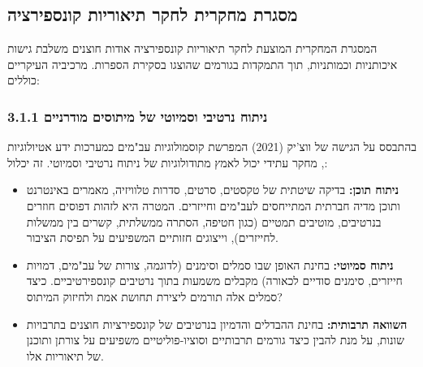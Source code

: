 \documentclass[12pt,a4paper]{article}
\begin{document}
\subsection{מסגרת מחקרית לחקר תיאוריות קונספירציה}

המסגרת המחקרית המוצעת לחקר תיאוריות קונספירציה אודות חוצנים משלבת גישות איכותניות וכמותניות, תוך התמקדות בגורמים שהוצגו בסקירת הספרות. מרכיביה העיקריים כוללים:

\subsubsection*{3.1.1 ניתוח נרטיבי וסמיוטי של מיתוסים מודרניים}
בהתבסס על הגישה של ווצ'יק (2021) המפרשת קוסמולוגיות עב"מים כמערכות ידע אטיולוגיות \cite{wojcik2021cosmologies}, מחקר עתידי יכול לאמץ מתודולוגיות של ניתוח נרטיבי וסמיוטי. זה יכלול:
\begin{itemize}
    \item \textbf{ניתוח תוכן:} בדיקה שיטתית של טקסטים, סרטים, סדרות טלוויזיה, מאמרים באינטרנט ותוכן מדיה חברתית המתייחסים לעב"מים וחייזרים. המטרה היא לזהות דפוסים חוזרים בנרטיבים, מוטיבים תמטיים (כגון חטיפה, הסתרה ממשלתית, קשרים בין ממשלות לחייזרים), וייצוגים חזותיים המשפיעים על תפיסת הציבור.
    \item \textbf{ניתוח סמיוטי:} בחינת האופן שבו סמלים וסימנים (לדוגמה, צורות של עב"מים, דמויות חייזרים, סימנים סודיים לכאורה) מקבלים משמעות בתוך נרטיבים קונספירטיביים. כיצד סמלים אלה תורמים ליצירת תחושת אמת ולחיזוק המיתוס?
    \item \textbf{השוואה תרבותית:} בחינת ההבדלים והדמיון בנרטיבים של קונספירציות חוצנים בתרבויות שונות, על מנת להבין כיצד גורמים תרבותיים וסוציו-פוליטיים משפיעים על צורתן ותוכנן של תיאוריות אלו.
\end{itemize}
\end{document}
